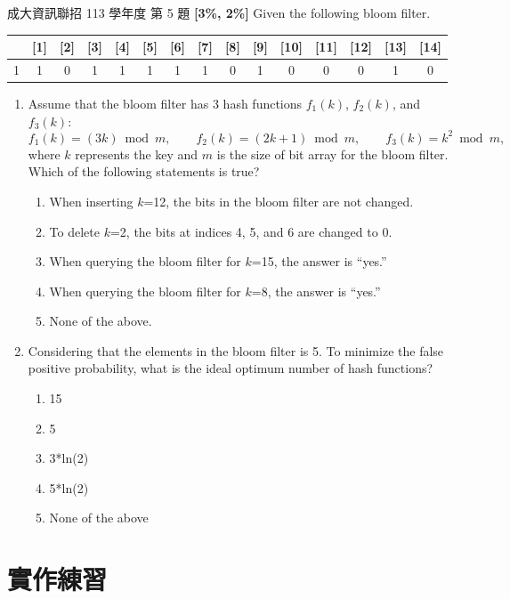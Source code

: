 \begin{pastexam}[label={px:hash-5}]{成大資訊聯招 113 學年度 第 5 題}
\textbf{[3\%, 2\%]} Given the following bloom filter.
\begin{center}
\small
\begin{tabular}{|*{15}{c|}}
\hline
[0] & [1] & [2] & [3] & [4] & [5] & [6] & [7] & [8] & [9] & [10] & [11] & [12] & [13] & [14] \\ \hline
1 & 1 & 0 & 1 & 1 & 1 & 1 & 1 & 0 & 1 & 0 & 0 & 0 & 1 & 0 \\ \hline
\end{tabular}
\end{center}
\begin{enumerate}[label=\roman*)]
\item Assume that the bloom filter has 3 hash functions $f_1(k)$, $f_2(k)$, and $f_3(k)$:
\[ f_1(k)=(3k) \bmod m,\qquad f_2(k)=(2k+1) \bmod m,\qquad f_3(k)=k^2 \bmod m, \]
where $k$ represents the key and $m$ is the size of bit array for the bloom filter. Which of the following statements is true?
\begin{enumerate}[label=(\Alph*)]
\item When inserting $k$=12, the bits in the bloom filter are not changed.
\item To delete $k$=2, the bits at indices 4, 5, and 6 are changed to 0.
\item When querying the bloom filter for $k$=15, the answer is ``yes.''
\item When querying the bloom filter for $k$=8, the answer is ``yes.''
\item None of the above.
\end{enumerate}
\item Considering that the elements in the bloom filter is 5. To minimize the false positive probability, what is the ideal optimum number of hash functions?
\begin{enumerate}[label=(\Alph*)]
\item 15
\item 5
\item 3*ln(2)
\item 5*ln(2)
\item None of the above
\end{enumerate}
\end{enumerate}
\end{pastexam}


\section{實作練習}
\label{sec:hash-practice}

